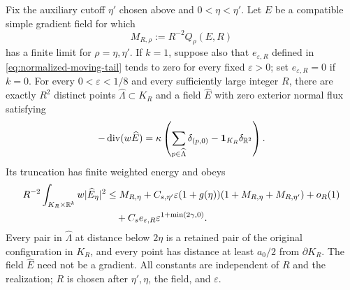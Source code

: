 \begin{lemma}\label{lem:field-screening}
Fix the auxiliary cutoff $\eta'$ chosen above and $0<\eta<\eta'$.
Let $E$ be a compatible simple gradient field for which
\[
 M_{R,\rho}:=R^{-2}Q_\rho(E,R)
\]
has a finite limit for $\rho=\eta,\eta'$. If $k=1$, suppose also that
$e_{\varepsilon,R}$ defined in \eqref{eq:normalized-moving-tail} tends to
zero for every fixed $\varepsilon>0$; set $e_{\varepsilon,R}=0$ if $k=0$.
For every $0<\varepsilon<1/8$ and every sufficiently large integer $R$,
there are exactly $R^2$ distinct points $\widehat\Lambda\subset K_R$
and a field $\widehat E$ with zero exterior normal flux satisfying
\[
 -\operatorname{div}(w\widehat E)
 =\kappa\left(\sum_{p\in\widehat\Lambda}\delta_{(p,0)}
                 -\mathbf1_{K_R}\delta_{\mathbb R^2}\right).
\]
Its truncation has finite weighted energy and obeys
\begin{align*}
 R^{-2}\int_{K_R\times\mathbb R^k}w|\widehat E_\eta|^2
 &\le M_{R,\eta}
 +C_{s,\eta'}\varepsilon(1+g(\eta))
                     (1+M_{R,\eta}+M_{R,\eta'})+o_R(1)\\
 &\quad+C_s e_{\varepsilon,R}
                     \varepsilon^{1+\min(2\gamma,0)}.
\end{align*}
Every pair in $\widehat\Lambda$ at distance below $2\eta$ is a retained
pair of the original configuration in $K_R$, and every point has distance
at least $a_0/2$ from $\partial K_R$. The field $\widehat E$ need not be
a gradient. All constants are independent of $R$ and the realization;
$R$ is chosen after $\eta',\eta$, the field, and $\varepsilon$.
\end{lemma}

